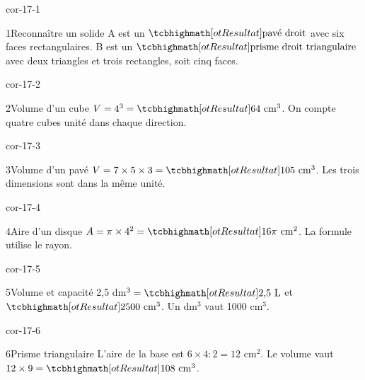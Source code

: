 \clearpage\pagestyle{otMain}\setlength{\otBlocEspacement}{2.5mm}\fontsize{11}{15}\selectfont{}
\begin{blocLivre}{cor-17-1}\begin{corrige}{1}{Reconnaître un solide}
A est un $\res{\text{pavé droit}}$ avec six faces rectangulaires. B est un $\res{\text{prisme droit triangulaire}}$ avec deux triangles et trois rectangles, soit cinq faces.
\label{fig-cor-17-1}
\end{corrige}\end{blocLivre}
\begin{blocLivre}{cor-17-2}\begin{corrige}{2}{Volume d’un cube}
$V=4^3=\res{64\ \mathrm{cm}^3}$. On compte quatre cubes unité dans chaque direction.
\label{fig-cor-17-2}
\end{corrige}\end{blocLivre}
\begin{blocLivre}{cor-17-3}\begin{corrige}{3}{Volume d’un pavé}
$V=7\times5\times3=\res{105\ \mathrm{cm}^3}$. Les trois dimensions sont dans la même unité.
\label{fig-cor-17-3}
\end{corrige}\end{blocLivre}
\begin{blocLivre}{cor-17-4}\begin{corrige}{4}{Aire d’un disque}
$A=\pi\times4^2=\res{16\pi\ \mathrm{cm}^2}$. La formule utilise le rayon.
\label{fig-cor-17-4}
\end{corrige}\end{blocLivre}
\begin{blocLivre}{cor-17-5}\begin{corrige}{5}{Volume et capacité}
2,5 dm$^3=\res{2{,}5\ \mathrm L}$ et $\res{2500\ \mathrm{cm}^3}$. Un dm$^3$ vaut 1000 cm$^3$.
\label{fig-cor-17-5}
\end{corrige}\end{blocLivre}
\begin{blocLivre}{cor-17-6}\begin{corrige}{6}{Prisme triangulaire}
L’aire de la base est $6\times4:2=12$ cm$^2$. Le volume vaut $12\times9=\res{108\ \mathrm{cm}^3}$.
\label{fig-cor-17-6}
\end{corrige}\end{blocLivre}
